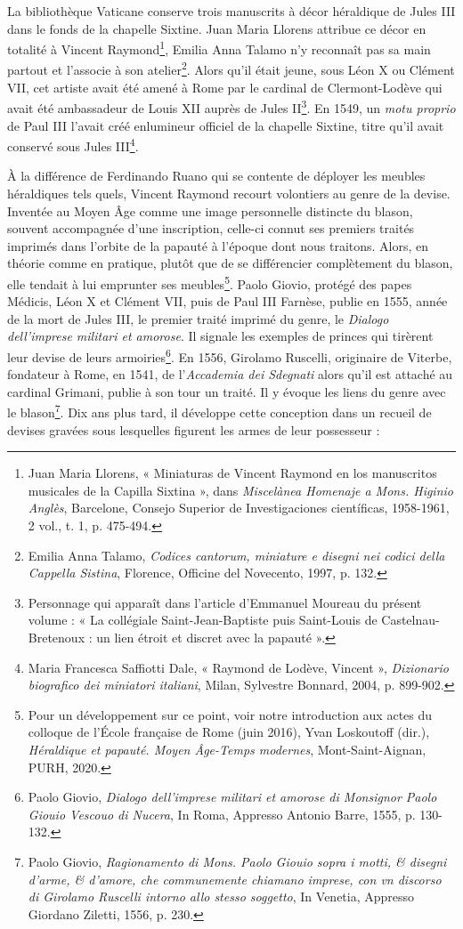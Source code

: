 \documentclass[12pt,twoside,openany]{book}
\begin{document}
La bibliothèque Vaticane conserve trois manuscrits à décor héraldique de Jules III dans le fonds de la chapelle Sixtine. Juan Maria Llorens attribue ce décor en totalité à Vincent Raymond\footnote{Juan Maria Llorens, « Miniaturas de Vincent Raymond en los manuscritos musicales de la Capilla Sixtina », dans \textit{Miscelànea Homenaje a Mons. Higinio Anglès}, Barcelone, Consejo Superior de Investigaciones científicas, 1958-1961, 2 vol., t. 1, p. 475-494.}, Emilia Anna Talamo n’y reconnaît pas sa main partout et l’associe à son atelier\footnote{Emilia Anna Talamo, \textit{Codices cantorum, miniature e disegni nei codici della Cappella Sistina}, Florence, Officine del Novecento, 1997, p. 132.}. Alors qu’il était jeune, sous Léon X ou Clément VII, cet artiste avait été amené à Rome par le cardinal de Clermont-Lodève qui avait été ambassadeur de Louis XII auprès de Jules II\footnote{Personnage qui apparaît dans l’article d’Emmanuel Moureau du présent volume : « La collégiale Saint-Jean-Baptiste puis Saint-Louis de Castelnau-Bretenoux : un lien étroit et discret avec la papauté ».}. En 1549, un \textit{motu proprio} de Paul III l’avait créé enlumineur officiel de la chapelle Sixtine, titre qu’il avait conservé sous Jules III\footnote{Maria Francesca Saffiotti Dale, « Raymond de Lodève, Vincent », \textit{Dizionario biografico dei miniatori italiani}, Milan, Sylvestre Bonnard, 2004, p. 899-902.}.

À la différence de Ferdinando Ruano qui se contente de déployer les meubles héraldiques tels quels, Vincent Raymond recourt volontiers au genre de la devise. Inventée au Moyen Âge comme une image personnelle distincte du blason, souvent accompagnée d’une inscription, celle-ci connut ses premiers traités imprimés dans l’orbite de la papauté à l’époque dont nous traitons. Alors, en théorie comme en pratique, plutôt que de se différencier complètement du blason, elle tendait à lui emprunter ses meubles\footnote{Pour un développement sur ce point, voir notre introduction aux actes du colloque de l’École française de Rome (juin 2016), Yvan Loskoutoff (dir.), \textit{Héraldique et papauté. Moyen Âge-Temps modernes}, Mont-Saint-Aignan, PURH, 2020.}. Paolo Giovio, protégé des papes Médicis, Léon X et Clément VII, puis de Paul III Farnèse, publie en 1555, année de la mort de Jules III, le premier traité imprimé du genre, le \textit{Dialogo dell’imprese militari et amorose}. Il signale les exemples de princes qui tirèrent leur devise de leurs armoiries\footnote{Paolo Giovio,\textit{ Dialogo dell’imprese militari et amorose di Monsignor Paolo Giouio Vescouo di Nucera}, In Roma, Appresso Antonio Barre, 1555, p. 130-132.}. En 1556, Girolamo Ruscelli, originaire de Viterbe, fondateur à Rome, en 1541, de l’\textit{Accademia dei Sdegnati }alors qu’il est attaché au cardinal Grimani, publie à son tour un traité. Il y évoque les liens du genre avec le blason\footnote{Paolo Giovio, \textit{Ragionamento di Mons. Paolo Giouio sopra i motti, \& disegni d’arme, \& d’amore, che communemente chiamano imprese, con vn discorso di Girolamo Ruscelli intorno allo stesso soggetto}, In Venetia, Appresso Giordano Ziletti, 1556, p. 230.}. Dix ans plus tard, il développe cette conception dans un recueil de devises gravées sous lesquelles figurent les armes de leur possesseur :
\end{document}
